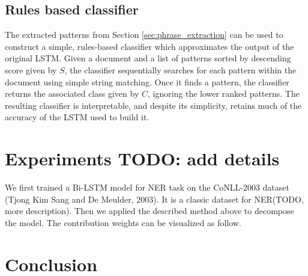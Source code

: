 \documentclass{article}
\begin{document}
\subsection{Rules based classifier}
The extracted patterns from Section \ref{sec:phrase_extraction} can be used to construct a simple, rules-based classifier which approximates the output of the original LSTM. Given a document and a list of patterns sorted by descending score given by $S$, the classifier sequentially searches for each pattern within the document using simple string matching. Once it finds a pattern, the classifier returns the associated class given by $C$, ignoring the lower ranked patterns. The resulting classifier is interpretable,  and despite its simplicity,  retains much of the accuracy of the LSTM used to build it.



\section{Experiments TODO: add details}

We first trained a Bi-LSTM model for NER task on the CoNLL-2003 dataset (Tjong Kim Sang and De Meulder, 2003). It is a classic dataset for NER(TODO, more description). Then we applied the described method above to decompose the model. The contribution weights can be visualized as follow.

 
\section{Conclusion}


\nocite{*}




\end{document}
